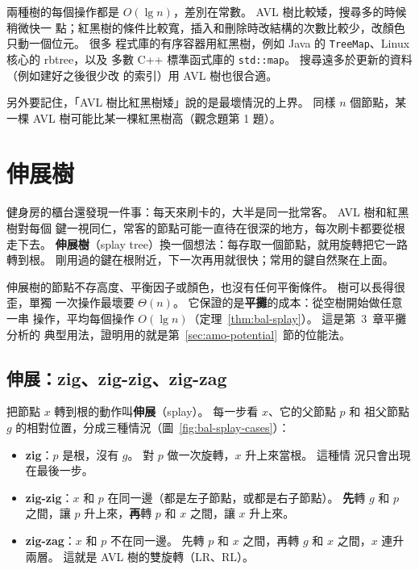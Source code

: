 兩種樹的每個操作都是 $O(\lg n)$，差別在常數。 AVL 樹比較矮，搜尋多的時候稍微快一
點；紅黑樹的條件比較寬，插入和刪除時改結構的次數比較少，改顏色只動一個位元。 很多
程式庫的有序容器用紅黑樹，例如 Java 的 \texttt{TreeMap}、Linux 核心的 rbtree，以及
多數 C++ 標準函式庫的 \texttt{std::map}。 搜尋遠多於更新的資料（例如建好之後很少改
的索引）用 AVL 樹也很合適。

另外要記住，「AVL 樹比紅黑樹矮」說的是最壞情況的上界。 同樣 $n$ 個節點，某一棵 AVL
樹可能比某一棵紅黑樹高（觀念題第 1 題）。

\section{伸展樹}
\label{sec:bal-splay}

健身房的櫃台還發現一件事：每天來刷卡的，大半是同一批常客。 AVL 樹和紅黑樹對每個
鍵一視同仁，常客的節點可能一直待在很深的地方，每次刷卡都要從根走下去。
\textbf{伸展樹}（splay tree）換一個想法：每存取一個節點，就用旋轉把它一路轉到根。
剛用過的鍵在根附近，下一次再用就很快；常用的鍵自然聚在上面。

伸展樹的節點不存高度、平衡因子或顏色，也沒有任何平衡條件。 樹可以長得很歪，單獨
一次操作最壞要 $\Theta(n)$。 它保證的是\textbf{平攤}的成本：從空樹開始做任意一串
操作，平均每個操作 $O(\lg n)$（定理~\ref{thm:bal-splay}）。 這是第~3~章平攤分析的
典型用法，證明用的就是第~\ref{sec:amo-potential}~節的位能法。

\subsection{伸展：zig、zig-zig、zig-zag}
\label{sec:bal-splay-op}

把節點 $x$ 轉到根的動作叫\textbf{伸展}（splay）。 每一步看 $x$、它的父節點 $p$ 和
祖父節點 $g$ 的相對位置，分成三種情況（圖~\ref{fig:bal-splay-cases}）：

\begin{itemize}
\item \textbf{zig}：$p$ 是根，沒有 $g$。 對 $p$ 做一次旋轉，$x$ 升上來當根。 這種情
況只會出現在最後一步。
\item \textbf{zig-zig}：$x$ 和 $p$ 在同一邊（都是左子節點，或都是右子節點）。
\textbf{先}轉 $g$ 和 $p$ 之間，讓 $p$ 升上來，\textbf{再}轉 $p$ 和 $x$ 之間，讓 $x$
升上來。
\item \textbf{zig-zag}：$x$ 和 $p$ 不在同一邊。 先轉 $p$ 和 $x$ 之間，再轉 $g$ 和
$x$ 之間，$x$ 連升兩層。 這就是 AVL 樹的雙旋轉（LR、RL）。
\end{itemize}

